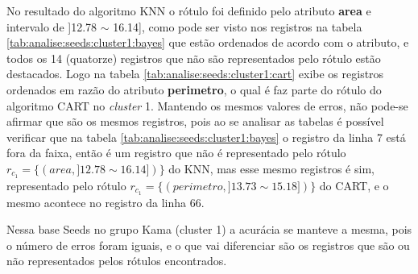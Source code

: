 No resultado do algoritmo KNN o rótulo foi definido pelo atributo \textbf{area} e intervalo de ]12.78 $\sim$ 16.14], como pode ser visto nos registros na tabela \ref{tab:analise:seeds:cluster1:bayes} que estão ordenados de acordo com o atributo, e todos os 14 (quatorze) registros que não são representados pelo rótulo estão destacados. Logo na tabela \ref{tab:analise:seeds:cluster1:cart} exibe os registros ordenados em razão do atributo \textbf{perimetro}, o qual é faz parte do rótulo do algoritmo CART no \textit{cluster} 1. Mantendo os mesmos valores de erros, não pode-se afirmar que são os mesmos registros, pois ao se analisar as tabelas é possível verificar que na tabela \ref{tab:analise:seeds:cluster1:bayes} o registro da linha 7 está fora da faixa, então é um registro que não é representado pelo rótulo ${r_{c_1}=\{ (area, ]12.78 \sim 16.14]) \} }$ do KNN, mas esse mesmo registros é sim, representado pelo rótulo ${r_{c_1}=\{ (perimetro, ]13.73 \sim 15.18]) \} }$ do CART, e o mesmo acontece no registro da linha 66. 

Nessa base Seeds no grupo Kama (cluster 1) a acurácia se manteve a mesma, pois o número de erros foram iguais, e o que vai diferenciar são os registros que são ou não representados pelos rótulos encontrados.
\newpage

